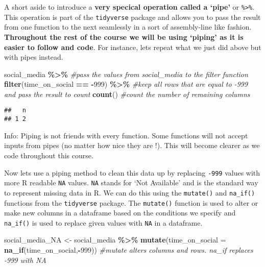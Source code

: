 \documentclass[
]{book}
\newenvironment{Shaded}{\begin{snugshade}}{\end{snugshade}}
\newcommand{\AttributeTok}[1]{\textcolor[rgb]{0.13,0.29,0.53}{#1}}
\newcommand{\CommentTok}[1]{\textcolor[rgb]{0.56,0.35,0.01}{\textit{#1}}}
\newcommand{\DecValTok}[1]{\textcolor[rgb]{0.00,0.00,0.81}{#1}}
\newcommand{\FunctionTok}[1]{\textcolor[rgb]{0.13,0.29,0.53}{\textbf{#1}}}
\newcommand{\NormalTok}[1]{#1}
\newcommand{\OtherTok}[1]{\textcolor[rgb]{0.56,0.35,0.01}{#1}}
\newcommand{\SpecialCharTok}[1]{\textcolor[rgb]{0.81,0.36,0.00}{\textbf{#1}}}
\begin{document}
A short aside to introduce a \textbf{very specical operation called a `pipe'} or \texttt{\%\textgreater{}\%}. This operation is part of the \texttt{tidyverse} package and allows you to pass the result from one function to the next seamlessly in a sort of assembly-line like fashion. \textbf{Throughout the rest of the course we will be using `piping' as it is easier to follow and code}. For instance, lets repeat what we just did above but with pipes instead.

\begin{Shaded}
\begin{Highlighting}[]
\NormalTok{social\_media }\SpecialCharTok{\%\textgreater{}\%} \CommentTok{\#pass the values from social\_media to the filter function}
  \FunctionTok{filter}\NormalTok{(time\_on\_social }\SpecialCharTok{==} \SpecialCharTok{{-}}\DecValTok{999}\NormalTok{) }\SpecialCharTok{\%\textgreater{}\%} \CommentTok{\#keep all rows that are equal to {-}999 and pass the result to count}
  \FunctionTok{count}\NormalTok{() }\CommentTok{\#count the number of remaining columns}
\end{Highlighting}
\end{Shaded}

\begin{verbatim}
##   n
## 1 2
\end{verbatim}

Info: Piping is not friends with every function. Some functions will not accept inputs from pipes (no matter how nice they are !). This will become clearer as we code throughout this course.

Now lets use a piping method to clean this data up by replacing \texttt{-999} values with more R readable \texttt{NA} values. \texttt{NA} stands for `Not Available' and is the standard way to represent missing data in R. We can do this using the \texttt{mutate()} and \texttt{na\_if()} functions from the \texttt{tidyverse} package. The \texttt{mutate()} function is used to alter or make new columns in a dataframe based on the conditions we specify and \texttt{na\_if()} is used to replace given values with \texttt{NA} in a dataframe.

\begin{Shaded}
\begin{Highlighting}[]
\NormalTok{social\_media\_NA }\OtherTok{\textless{}{-}}\NormalTok{ social\_media }\SpecialCharTok{\%\textgreater{}\%}
  \FunctionTok{mutate}\NormalTok{(}\AttributeTok{time\_on\_social =} \FunctionTok{na\_if}\NormalTok{(time\_on\_social,}\SpecialCharTok{{-}}\DecValTok{999}\NormalTok{)) }\CommentTok{\#mutate alters columns and rows. na\_if replaces {-}999 with NA}
\end{Highlighting}
\end{Shaded}
\end{document}
